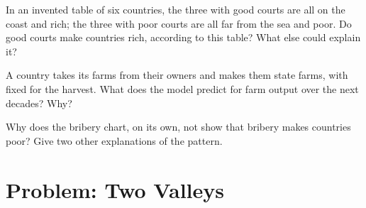 \begin{exercise}[$\star\star\star$]\label{exo:g9:institutions-and-prosperity:10}
In an invented table of six countries, the three with good courts are all on the coast and rich; the three
with poor courts are all far from the sea and poor. Do good courts make countries rich, according to this
table? What else could explain it?
\end{exercise}

\begin{exercise}[$\star\star\star$]\label{exo:g9:institutions-and-prosperity:11}
A country takes its farms from their owners and makes them state farms, with fixed  for the harvest.
What does the model predict for farm output over the next decades? Why?
\end{exercise}

\begin{exercise}[$\star\star\star$]\label{exo:g9:institutions-and-prosperity:12}
Why does the bribery chart, on its own, not show that bribery makes countries poor? Give two other
explanations of the pattern.
\end{exercise}

\section{Problem: Two Valleys}

